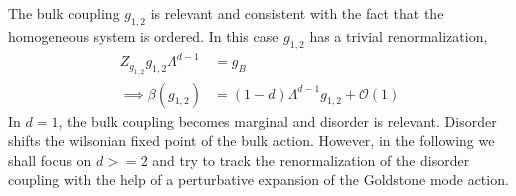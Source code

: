 \documentclass[notitlepage,onecolumn,showpacs,11pt]{revtex4-1}
\begin{document}
The bulk coupling $g_{1,2}$ is relevant and consistent with the fact that the
homogeneous system is ordered. In this case $g_{1,2}$ has a trivial 
renormalization,
\begin{equation}
    \begin{aligned}
        Z_{g_{1,2}}g_{1,2}\Lambda^{d-1} &= g_B \\
        \implies \beta(g_{1,2})
        &=(1-d)\Lambda^{d-1}g_{1,2} + \mathcal{O}(1)
    \end{aligned}
\end{equation}
In $d=1$, the bulk coupling becomes marginal and disorder is relevant. 
Disorder shifts the wilsonian fixed point of the bulk action. However, in
the following we shall focus on $d>=2$ and try to track the renormalization
of the disorder coupling with the help of a perturbative expansion of the
Goldstone mode action. 
\end{document}

